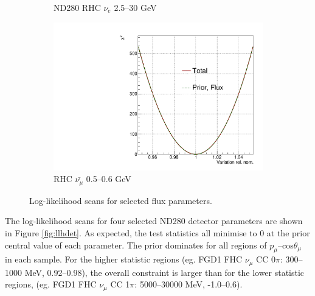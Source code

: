 \begin{figure}[!htbp]
\begin{subfigure}{.49\textwidth}
  \caption{ND280 RHC $\nu_e$ 2.5--30 GeV}
\end{subfigure}
\begin{subfigure}{.49\textwidth}
  \centering
  \includegraphics[width=0.7\linewidth]{figs/llh/b_52_llh.pdf}
  \caption{\SK RHC $\bar{\nu_{\mu}}$ 0.5--0.6 GeV}
\end{subfigure}
\caption{Log-likelihood scans for selected flux parameters. }
\label{fig:llhflux}
\end{figure}

The log-likelihood scans for four selected ND280 detector parameters are shown in Figure \ref{fig:llhdet}. As expected, the test statistics all minimise to 0 at the prior central value of each parameter. The prior dominates for all regions of $p_{\mu}$--cos$\theta_{\mu}$ in each sample. For the higher statistic regions (eg. FGD1 FHC $\nu_{\mu}$ CC 0$\pi$: 300--1000 MeV, 0.92--0.98), the overall constraint is larger than for the lower statistic regions, (eg. FGD1 FHC $\nu_{\mu}$ CC 1$\pi$: 5000--30000 MeV, -1.0--0.6). 

